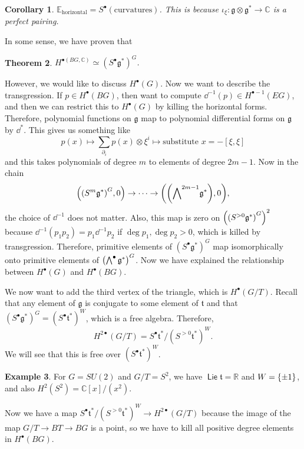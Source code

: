 \documentclass[leqno, openany]{memoir}
\newtheorem{thm}{Theorem}[section]
\newtheorem{cor}[thm]{Corollary}
\theoremstyle{definition}
\newtheorem{exm}[thm]{Example}
\theoremstyle{remark}
\theoremstyle{plain}
\theoremstyle{definition}
\theoremstyle{remark}
\newcommand{\R}{\mathbb{R}}
\newcommand{\C}{\mathbb{C}}
\newcommand{\E}{\mathbb{E}}
\newcommand{\mf}[1]{\mathfrak{#1}}
\DeclareMathOperator{\Lie}{\mathsf{Lie}}
\begin{document}
\begin{cor}
    $\E_{\text{horizontal}} = S^{\bullet}(\text{curvatures})$. This is because $\iota_{\xi} \colon \mf{g} \otimes \mf{g}^* \to \C$ is a perfect pairing.
\end{cor}

In some sense, we have proven that
\begin{thm}
    $H^{\bullet(BG, \C)} \simeq {(S^{\bullet} \mf{g}^*)}^G$.
\end{thm}

However, we would like to discuss $H^{\bullet}(G)$. Now we want to describe the transgression. If $p \in H^{\bullet}(BG)$, then want to compute $\dd^{-1}(p) \in H^{\bullet - 1}(EG)$, and then we can restrict this to $H^{\bullet}(G)$ by killing the horizontal forms. Therefore, polynomial functions on $\mf{g}$ map to polynomial differential forms on $\mf{g}$ by $\dd^*$. This gives us something like
\[ p(x) \mapsto \sum_{\partial_i} p(x) \otimes \xi^i \mapsto \text{substitute $x = -[\xi, \xi]$} \]
and this takes polynomials of degree $m$ to elements of degree $2m-1$. Now in the chain
\[ \qty( {(S^m\mf{g}^*)}^G, 0 ) \to \cdots \to \qty(\qty({\bigwedge}^{2m-1} \mf{g}^*), 0), \]
the choice of $\dd^{-1}$ does not matter. Also, this map is zero on ${\qty({(S^{>0} \mf{g}^*)}^G)}^2$ because $\dd^{-1} (p_1p_2) = p_1 \dd^{-1}p_2$ if $\deg p_1, \deg p_2 > 0$, which is killed by transgression. Therefore, primitive elements of ${(S^{\bullet}\mf{g}^*)}^G$ map isomorphically onto primitive elements of ${\qty(\bigwedge^{\bullet} \mf{g}^*)}^G$. Now we have explained the relationship between $H^{\bullet}(G)$ and $H^{\bullet}(BG)$. 

We now want to add the third vertex of the triangle, which is $H^{\bullet}(G/T)$. Recall that any element of $\mf{g}$ is conjugate to some element of $\mf{t}$ and that ${(S^{\bullet} \mf{g}^*)}^G = {(S^{\bullet} \mf{t}^*)}^W$, which is a free algebra. Therefore, 
\[ H^{2\bullet}(G/T) = S^{\bullet} \mf{t^*} / {(S^{>0} \mf{t}^*)}^W. \]
We will see that this is free over ${(S^{\bullet} \mf{t}^*)}^W$.
\begin{exm}
    For $G = SU(2)$ and $G/T = S^2$, we have $\Lie \mf{t} = \R$ and $W = \qty{\pm 1}$, and also $H^2(S^2) = \C[x] / (x^2)$.
\end{exm}

Now we have a map $S^{\bullet} \mf{t}^* / {(S^{>0} \mf{t}^*)}^W \to H^{2 \bullet}(G/T)$ because the image of the map $G/T \to BT \to BG$ is a point, so we have to kill all positive degree elements in $H^{\bullet}(BG)$.
\end{document}
